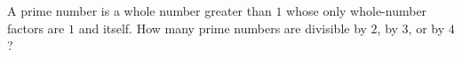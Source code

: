 A prime number is a whole number greater than $1$ whose only whole-number factors are $1$ and itself. How many prime numbers are divisible by $2$, by $3$, or by $4$?
